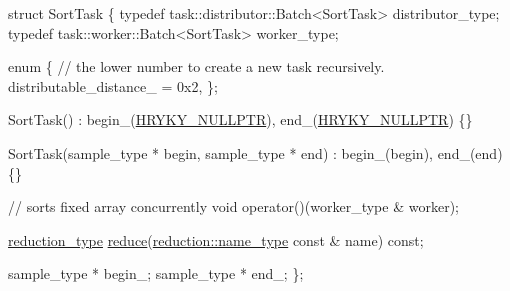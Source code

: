 \begin{DoxyCodeInclude}
    \textcolor{keyword}{struct }SortTask
    \{
        \textcolor{keyword}{typedef} task::distributor::Batch<SortTask>  distributor\_type;
        \textcolor{keyword}{typedef} task::worker::Batch<SortTask>       worker\_type;

        \textcolor{keyword}{enum}
        \{
            \textcolor{comment}{// the lower number to create a new task recursively.}
            distributable\_distance\_ = 0x2,
        \};
        
        SortTask() : begin\_(\hyperlink{common_8h_a4cd4ac09cfcdbd6b30ee69afc156e210}{HRYKY_NULLPTR}), end\_(\hyperlink{common_8h_a4cd4ac09cfcdbd6b30ee69afc156e210}{HRYKY_NULLPTR}) \{\}
        
        SortTask(sample\_type * begin, sample\_type * end)
            : begin\_(begin), end\_(end) \{\}

        \textcolor{comment}{// sorts fixed array concurrently}
        \textcolor{keywordtype}{void} operator()(worker\_type & worker);

        \hyperlink{namespacehryky_a343a9a4c36a586be5c2693156200eadc}{reduction_type} \hyperlink{namespacehryky_af41cb3af6766761da0ff21b84527a52c}{reduce}(\hyperlink{namespacehryky_1_1reduction_ac686c30a4c8d196bbd0f05629a6b921f}{reduction::name_type} \textcolor{keyword}{const} & name) \textcolor{keyword}{const};

        sample\_type *   begin\_;
        sample\_type *   end\_;
    \};

\end{DoxyCodeInclude}
 